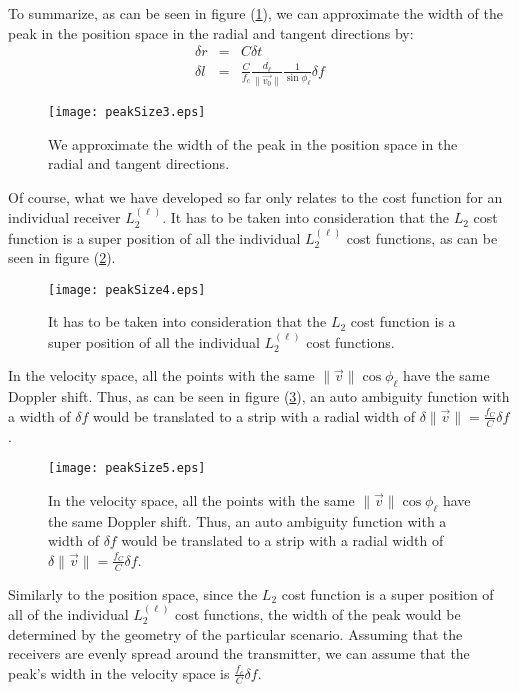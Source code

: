 To summarize, as can be seen in figure (\ref{fig:peakSize3}), we can approximate the width of the peak in the position space in the radial and tangent directions by:
\begin{eqnarray}
\delta r &=& C \delta t \nonumber \\
\delta l &=& \frac{C}{f_c} \frac{d_\ell}{\|\vec{v_0}\|}\frac{1}{\sin \phi_\ell} \delta f \nonumber
\end{eqnarray}


\begin{figure}[h]
\begin{center}
\texttt{[image: peakSize3.eps]}
\end{center}
\caption[Cost Function's peaks width]{We approximate the width of the peak in the position space in the radial and tangent directions.}
\label{fig:peakSize3}
\end{figure}

Of course, what we have developed so far only relates to the cost function for an individual receiver $L_2^{(\ell)}$. It has to be taken into consideration that the $L_2$ cost function is a super position of all the individual $L_2^{(\ell)}$ cost functions, as can be seen in figure (\ref{fig:peakSize4}).

\begin{figure}[h]
\begin{center}
\texttt{[image: peakSize4.eps]}
\end{center}
\caption[$L_2$ cost function as a superposition of the individual $L_2^{(\ell)}$ cost functions]{It has to be taken into consideration that the $L_2$ cost function is a super position of all the individual $L_2^{(\ell)}$ cost functions.}
\label{fig:peakSize4}
\end{figure}


In the velocity space, all the points with the same $\|\vec{v}\| \cos \phi_\ell$ have the same Doppler shift. Thus, as can be seen in figure (\ref{fig:peakSize5}), an auto ambiguity function with a width of $\delta f$ would be translated to a strip with a radial width of $\delta \|\vec{v}\| = \frac{f_C}{C}\delta f$.

\begin{figure}[h]
\begin{center}
\texttt{[image: peakSize5.eps]}
\end{center}
\caption[Auto ambiguity function translation to velocity space]{In the velocity space, all the points with the same $\|\vec{v}\| \cos \phi_\ell$ have the same Doppler shift. Thus, an auto ambiguity function with a width of $\delta f$ would be translated to a strip with a radial width of $\delta \|\vec{v}\| = \frac{f_C}{C}\delta f$.}
\label{fig:peakSize5}
\end{figure}


Similarly to the position space, since the $L_2$ cost function is a super position of all of the individual $L_2^{(\ell)}$ cost functions, the width of the peak would be determined by the geometry of the particular scenario. Assuming that the receivers are evenly spread around the transmitter, we can assume that the peak's width in the velocity space is $\frac{f_c}{C}\delta f$.
